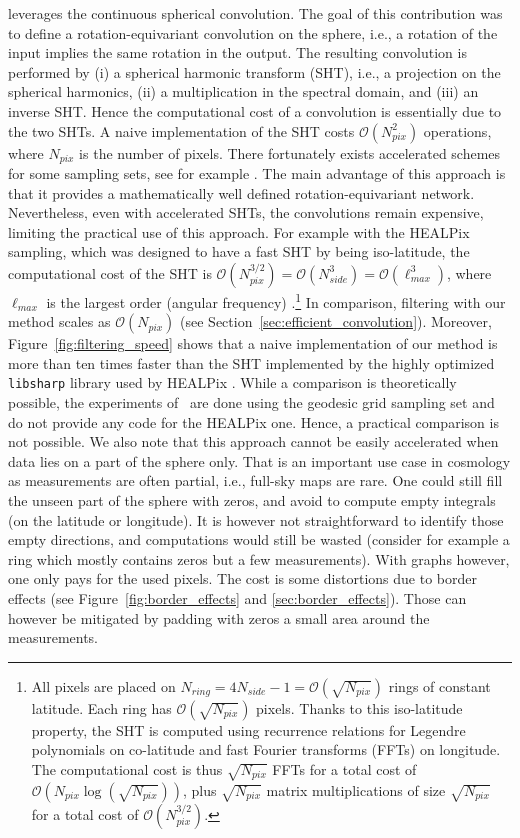 \documentclass[final,twocolumn,3p,times,authoryear]{elsarticle}
\newcommand{\figref}[1]{Figure~\ref{fig:#1}}
\newcommand{\secref}[1]{Section~\ref{sec:#1}}
\newcommand{\1}{\b{1}}              %
\newcommand{\0}{\b{0}}              %
\newcommand{\bO}{\mathcal{O}}
\newcommand{\pkg}[1]{\texttt{#1}}
\begin{document}
\citet{cohen2018spherical} leverages the continuous spherical convolution. The goal of this contribution was to define a rotation-equivariant convolution on the sphere, i.e., a rotation of the input implies the same rotation in the output.
The resulting convolution is performed by (i) a spherical harmonic transform (SHT), i.e., a projection on the spherical harmonics, (ii) a  multiplication in the spectral domain, and (iii) an inverse SHT. Hence the computational cost of a convolution is essentially due to the two SHTs. A naive implementation of the SHT costs $\bO(N_{pix}^2)$ operations, where $N_{pix}$ is the number of pixels. There fortunately exists accelerated schemes for some sampling sets, see for example \citet{mohlenkamp1999fast, rokhlin2006fast, reinecke2013libsharp}.
The main advantage of this approach is that it provides a mathematically well defined rotation-equivariant network. Nevertheless, even with accelerated SHTs, the convolutions remain expensive, limiting the practical use of this approach.
For example with the HEALPix sampling, which was designed to have a fast SHT by being iso-latitude, the computational cost of the SHT is $\bO(N_{pix}^{3/2}) = \bO(N_{side}^3) = \bO(\ell_{max}^3)$, where $\ell_{max}$ is the largest order (angular frequency) \citep{gorski2005healpix, reinecke2013libsharp}.\footnote{All pixels are placed on $N_{ring} = 4N_{side}-1 = \bO(\sqrt{N_{pix}})$ rings of constant latitude. Each ring has $\bO(\sqrt{N_{pix}})$ pixels. Thanks to this iso-latitude property, the SHT is computed using recurrence relations for Legendre polynomials on co-latitude and fast Fourier transforms (FFTs) on longitude. The computational cost is thus $\sqrt{N_{pix}}$ FFTs for a total cost of $\bO(N_{pix} \log(\sqrt{N_{pix}}))$, plus $\sqrt{N_{pix}}$ matrix multiplications of size $\sqrt{N_{pix}}$ for a total cost of $\bO(N_{pix}^{3/2})$.}
In comparison, filtering with our method scales as $\bO(N_{pix})$ (see \secref{efficient_convolution}). Moreover, \figref{filtering_speed} shows that a naive implementation of our method is more than ten times faster than the SHT implemented by the highly optimized \pkg{libsharp} library used by HEALPix \citep{reinecke2013libsharp}.
While a comparison is theoretically possible, the experiments of~\cite{cohen2018spherical} are done using the geodesic grid sampling set and do not provide any code for the HEALPix one. Hence, a practical comparison is not possible.
We also note that this approach cannot be easily accelerated when data lies on a part of the sphere only. That is an important use case in cosmology as measurements are often partial, i.e., full-sky maps are rare. One could still fill the unseen part of the sphere with zeros, and avoid to compute empty integrals (on the latitude or longitude). It is however not straightforward to identify those empty directions, and computations would still be wasted (consider for example a ring which mostly contains zeros but a few measurements). With graphs however, one only pays for the used pixels. The cost is some distortions due to border effects (see \figref{border_effects} and \ref{sec:border_effects}). Those can however be mitigated by padding with zeros a small area around the measurements.
\end{document}
